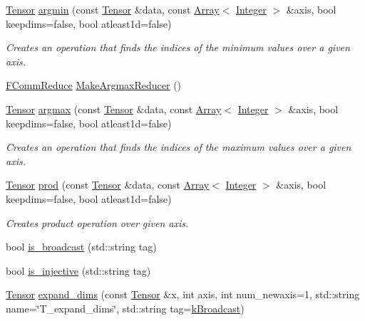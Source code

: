 \begin{DoxyCompactItemize}
\hyperlink{classtvm_1_1te_1_1Tensor}{Tensor} \hyperlink{namespacetopi_a9a022c65050aa8fdab162cfb6775b865}{argmin} (const \hyperlink{classtvm_1_1te_1_1Tensor}{Tensor} \&data, const \hyperlink{classtvm_1_1Array}{Array}$<$ \hyperlink{classtvm_1_1Integer}{Integer} $>$ \&axis, bool keepdims=false, bool atleast1d=false)
\begin{DoxyCompactList}\small\item\em Creates an operation that finds the indices of the minimum values over a given axis. \end{DoxyCompactList}\item 
\hyperlink{namespacetopi_a8baac534d5ff12a20f089736a0e60f14}{F\+Comm\+Reduce} \hyperlink{namespacetopi_af82f23bc79d3ecca9919b45568192d07}{Make\+Argmax\+Reducer} ()
\item 
\hyperlink{classtvm_1_1te_1_1Tensor}{Tensor} \hyperlink{namespacetopi_a94f412c82e4225050328fae33a3342f2}{argmax} (const \hyperlink{classtvm_1_1te_1_1Tensor}{Tensor} \&data, const \hyperlink{classtvm_1_1Array}{Array}$<$ \hyperlink{classtvm_1_1Integer}{Integer} $>$ \&axis, bool keepdims=false, bool atleast1d=false)
\begin{DoxyCompactList}\small\item\em Creates an operation that finds the indices of the maximum values over a given axis. \end{DoxyCompactList}\item 
\hyperlink{classtvm_1_1te_1_1Tensor}{Tensor} \hyperlink{namespacetopi_a6566893e24ac42a7704fac00efe59121}{prod} (const \hyperlink{classtvm_1_1te_1_1Tensor}{Tensor} \&data, const \hyperlink{classtvm_1_1Array}{Array}$<$ \hyperlink{classtvm_1_1Integer}{Integer} $>$ \&axis, bool keepdims=false, bool atleast1d=false)
\begin{DoxyCompactList}\small\item\em Creates product operation over given axis. \end{DoxyCompactList}\item 
bool \hyperlink{namespacetopi_aeaf79d9b22b36fc51e7d1bb5ad331802}{is\+\_\+broadcast} (std\+::string tag)
\item 
bool \hyperlink{namespacetopi_a83c42e686c1268b3a5bca51ba88e45b2}{is\+\_\+injective} (std\+::string tag)
\item 
\hyperlink{classtvm_1_1te_1_1Tensor}{Tensor} \hyperlink{namespacetopi_a43f5f5b2746b7a9075f66b0d477e8ffc}{expand\+\_\+dims} (const \hyperlink{classtvm_1_1te_1_1Tensor}{Tensor} \&x, int axis, int num\+\_\+newaxis=1, std\+::string name=\char`\"{}T\+\_\+expand\+\_\+dims\char`\"{}, std\+::string tag=\hyperlink{namespacetopi_a794b9155e9ba9d1c9c42a1cff1fb645f}{k\+Broadcast})

\end{DoxyCompactItemize}
